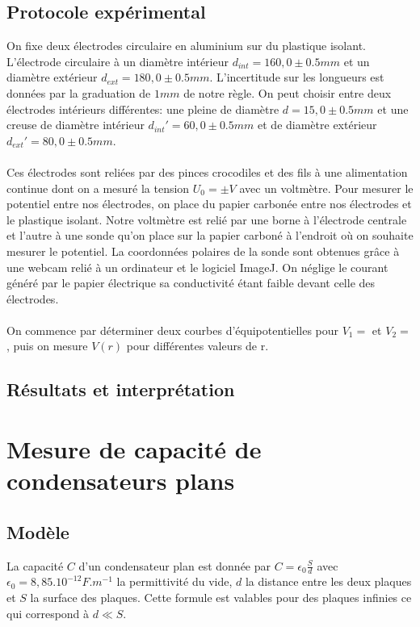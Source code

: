 \documentclass[12pt]{article}
\begin{document}
	
	
	\subsection{Protocole expérimental}
	
On fixe deux électrodes circulaire en aluminium sur du plastique isolant. L'électrode circulaire à un diamètre intérieur $d_{int}=160,0\pm 0.5 mm$ et un diamètre extérieur $d_{ext}=180,0\pm 0.5 mm$. L'incertitude sur les longueurs est données par la graduation de $1mm$ de notre règle. On peut choisir entre deux électrodes intérieurs différentes: une pleine de diamètre $d=15,0\pm 0.5 mm$ et une creuse de diamètre intérieur $d_{int}'=60,0\pm 0.5 mm$ et de diamètre extérieur $d_{ext}'=80,0\pm 0.5 mm$. \\ \\ 
Ces électrodes sont reliées par des pinces crocodiles et des fils à une alimentation continue dont on a mesuré la tension $U_0= \pm V$ avec un  voltmètre. Pour mesurer le potentiel entre nos électrodes, on place du papier carbonée entre nos électrodes et le plastique isolant. Notre voltmètre est relié par une borne à l'électrode centrale et l'autre à une sonde qu'on place sur la papier carboné à l'endroit où on souhaite mesurer le potentiel. La coordonnées polaires de la sonde sont obtenues grâce à une webcam relié à un ordinateur et le logiciel ImageJ. On néglige le courant généré par le papier électrique sa conductivité étant faible devant celle des électrodes. \\ \\
On commence par déterminer deux courbes d'équipotentielles pour $V_1=$ et $V_2=$, puis on mesure $V(r)$ pour différentes valeurs de r.  
	
	\subsection{Résultats et interprétation}
	
	
\section{Mesure de capacité de condensateurs plans}
	\subsection{Modèle}
La capacité $C$ d'un condensateur plan est donnée par $C=\epsilon_0\frac{S}{d}$ avec $\epsilon_0=8,85.10^{-12} F.m^{-1}$ la permittivité du vide, $d$ la distance entre les deux plaques et $S$ la surface des plaques. Cette formule est valables pour des plaques infinies ce qui correspond à $d\ll S$. \\
\end{document}
